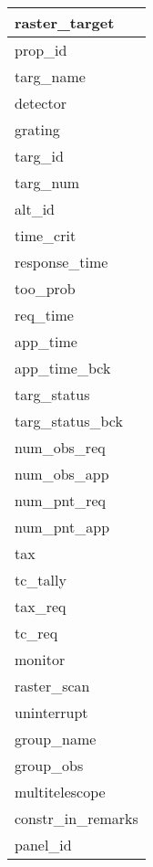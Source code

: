 \documentclass{article}
\begin{document}

\begin{tabular}{|l|} \hline
\textbf{raster\_target} \\ \hline
prop\_id \\ \hline
targ\_name \\ \hline
detector \\ \hline
grating \\ \hline
targ\_id \\ \hline
targ\_num \\ \hline
alt\_id \\ \hline
time\_crit \\ \hline
response\_time \\ \hline
too\_prob \\ \hline
req\_time \\ \hline
app\_time \\ \hline
app\_time\_bck \\ \hline
targ\_status \\ \hline
targ\_status\_bck \\ \hline
num\_obs\_req \\ \hline
num\_obs\_app \\ \hline
num\_pnt\_req \\ \hline
num\_pnt\_app \\ \hline
tax \\ \hline
tc\_tally \\ \hline
tax\_req \\ \hline
tc\_req \\ \hline
monitor \\ \hline
raster\_scan \\ \hline
uninterrupt \\ \hline
group\_name \\ \hline
group\_obs \\ \hline
multitelescope \\ \hline
constr\_in\_remarks \\ \hline
panel\_id \\ \hline
\end{tabular}
\end{document}
